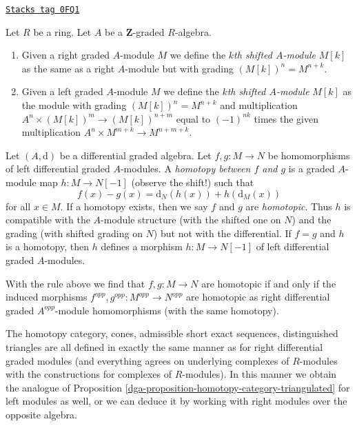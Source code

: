 \begin{definition}
\label{dga-definition-shift-graded-module}
\href{https://stacks.math.columbia.edu/tag/0FQ1}{\texttt{Stacks tag 0FQ1}}

Let $R$ be a ring. Let $A$ be a $\mathbf{Z}$-graded $R$-algebra.
\begin{enumerate}
\item Given a right graded $A$-module $M$ we define the
{\it $k$th shifted $A$-module} $M[k]$ as the same as
a right $A$-module but with grading $(M[k])^n = M^{n + k}$.
\item Given a left graded $A$-module $M$ we define the
{\it $k$th shifted $A$-module} $M[k]$ as the module
with grading $(M[k])^n = M^{n + k}$ and multiplication
$A^n \times (M[k])^m \to (M[k])^{n + m}$
equal to $(-1)^{nk}$ times the given multiplication
$A^n \times M^{m + k} \to M^{n + m + k}$.
\end{enumerate}
\end{definition}

Let $(A, \text{d})$ be a differential graded algebra. Let
$f, g : M \to N$ be homomorphisms of left differential graded $A$-modules.
A {\it homotopy between $f$ and $g$} is a graded $A$-module map
$h : M \to N[-1]$ (observe the shift!) such that
$$
f(x) - g(x) = \text{d}_N(h(x)) + h(\text{d}_M(x))
$$
for all $x \in M$. If a homotopy exists, then we say $f$ and $g$ are
{\it homotopic}. Thus $h$ is compatible with the $A$-module structure
(with the shifted one on $N$) and the grading (with shifted grading on $N$)
but not with the differential. If $f = g$ and $h$ is a homotopy, then
$h$ defines a morphism $h : M \to N[-1]$ of left differential
graded $A$-modules.

\medskip\noindent
With the rule above we find that $f, g : M \to N$ are homotopic if
and only if the induced morphisms
$f^{opp}, g^{opp} : M^{opp} \to N^{opp}$
are homotopic as right differential graded $A^{opp}$-module homomorphisms
(with the same homotopy).

\medskip\noindent
The homotopy category, cones, admissible short exact sequences,
distinguished triangles are all defined in exactly the same manner
as for right differential graded modules (and everything agrees
on underlying complexes of $R$-modules with the constructions for
complexes of $R$-modules). In this manner we obtain the analogue of
Proposition \ref{dga-proposition-homotopy-category-triangulated}
for left modules as well, or we can deduce it by working
with right modules over the opposite algebra.


